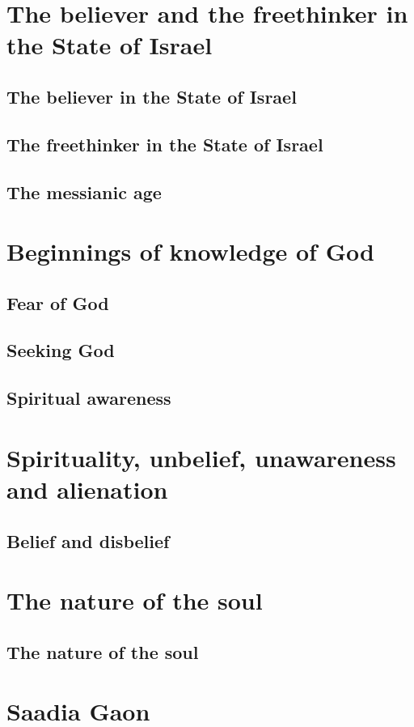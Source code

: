 \documentclass[11pt, a5paper, twoside, chapterprefix, openany]{scrbook}
\begin{document}
\part{The believer and the freethinker in the State of Israel}
\chapter{The believer in the State of Israel}
\chapter{The freethinker in the State of Israel}
\chapter{The messianic age}
\part{Beginnings of knowledge of God}
\chapter{Fear of God}
\chapter{Seeking God}
\chapter{Spiritual awareness}
\part{Spirituality, unbelief, unawareness and alienation}
\chapter{Belief and disbelief}
\part{The nature of the soul}
\chapter{The nature of the soul}
\part{Saadia Gaon}
\end{document}
